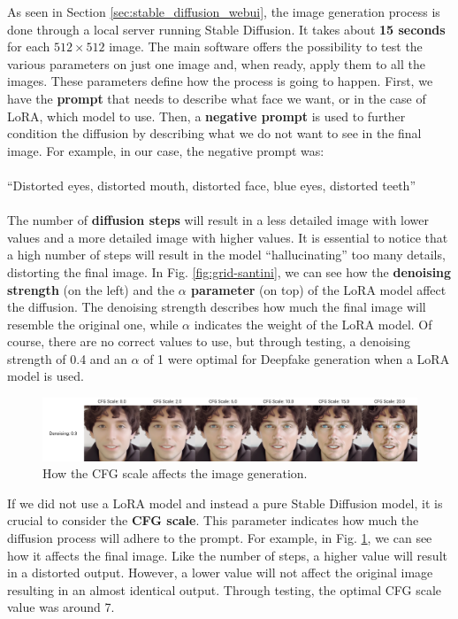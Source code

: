 \documentclass[preprint]{elsarticle}
\begin{document}
As seen in Section \ref{sec:stable_diffusion_webui}, the image generation process is done through 
a local server running Stable Diffusion. 
It takes about \textbf{15 seconds} for each $512 \times 512$ image. 
The main software offers the possibility to test the various parameters 
on just one image and, when ready, apply them to all the images. 
These parameters define how the process is going to happen.
First, we have the \textbf{prompt} that needs to describe what face we want, or in the case of LoRA, 
which model to use.
Then, a \textbf{negative prompt} is used to further condition the diffusion by 
describing what we do not want to see in the final image. 
For example, in our case, the negative prompt was:\\\\
``Distorted eyes, distorted mouth, distorted face, blue eyes, distorted teeth''\\\\
The number of \textbf{diffusion steps} will result in a less detailed image with lower values and 
a more detailed image with higher values. 
It is essential to notice that a high number of steps will result in the model 
``hallucinating'' too many details, distorting the final image.
In Fig. \ref{fig:grid-santini}, we can see how the \textbf{denoising strength} (on the left) 
and the \textbf{$\alpha$ parameter} (on top) of the LoRA model affect the diffusion. 
The denoising strength describes how much the final image will resemble the original one, 
while $\alpha$ indicates the weight of the LoRA model. 
Of course, there are no correct values to use, but through testing, 
a denoising strength of 0.4 and an $\alpha$ of 1 were optimal for
Deepfake generation when a LoRA model is used. 
\begin{figure}[H]
	\centering
	\includegraphics[width=\textwidth, keepaspectratio]{img/project_img/cfg-examples.png}
	\caption{How the CFG scale affects the image generation.}
	\label{fig:cfg-examples}
\end{figure}
If we did not use a LoRA model and instead a pure Stable Diffusion model, 
it is crucial to consider the \textbf{CFG scale}. 
This parameter indicates how much the diffusion process will adhere to the prompt. 
For example, in Fig. \ref{fig:cfg-examples}, we can see how it affects the final image. 
Like the number of steps, a higher value will result in a distorted output. 
However, a lower value will not affect the original image resulting in an almost identical output. 
Through testing, the optimal CFG scale value was around 7.
\end{document}
